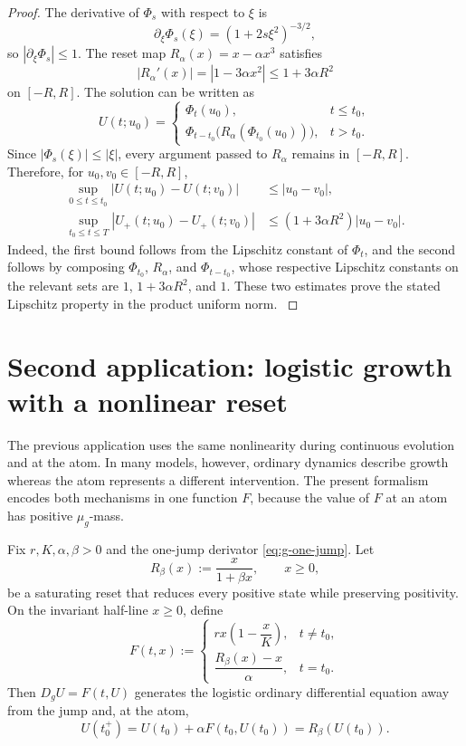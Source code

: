 \documentclass[preprint,12pt]{elsarticle}
\newenvironment{revision}{\begingroup\color{red}}{\endgroup}
\newenvironment{revision}{}{}
\theoremstyle{definition}
\theoremstyle{remark}
\begin{document}
\begin{proof}
The derivative of $\Phi_s$ with respect to $\xi$ is
\[
 \partial_\xi\Phi_s(\xi)=(1+2s\xi^2)^{-3/2},
\]
so $|\partial_\xi\Phi_s|\le1$. The reset map $R_\alpha(x)=x-\alpha x^3$ satisfies
\[
 |R_\alpha'(x)|=|1-3\alpha x^2|\le1+3\alpha R^2
\]
on $[-R,R]$. The solution can be written as
\[
 U(t;u_0)=
 \begin{cases}
 \Phi_t(u_0),&t\le t_0,\\
 \Phi_{t-t_0}\bigl(R_\alpha(\Phi_{t_0}(u_0))\bigr),&t>t_0.
 \end{cases}
\]
\begin{revision}
Since \(|\Phi_s(\xi)|\le|\xi|\), every argument passed to \(R_\alpha\)
remains in \([-R,R]\).  Therefore, for \(u_0,v_0\in[-R,R]\),
\begin{align*}
 \sup_{0\le t\le t_0}|U(t;u_0)-U(t;v_0)|
 &\le |u_0-v_0|,\\
 \sup_{t_0\le t\le T}|U_+(t;u_0)-U_+(t;v_0)|
 &\le (1+3\alpha R^2)|u_0-v_0|.
\end{align*}
Indeed, the first bound follows from the Lipschitz constant of \(\Phi_t\), and
the second follows by composing \(\Phi_{t_0}\), \(R_\alpha\), and
\(\Phi_{t-t_0}\), whose respective Lipschitz constants on the relevant sets are
\(1\), \(1+3\alpha R^2\), and \(1\).  These two estimates prove the stated
Lipschitz property in the product uniform norm.
\end{revision}
\end{proof}

\section{Second application: logistic growth with a nonlinear reset}\label{sec:logistic}

The previous application uses the same nonlinearity during continuous evolution and at the atom. In many models, however, ordinary dynamics describe growth whereas the atom represents a different intervention. The present formalism encodes both mechanisms in one function $F$, because the value of $F$ at an atom has positive $\mu_g$-mass.

Fix $r,K,\alpha,\beta>0$ and the one-jump derivator \eqref{eq:g-one-jump}. Let
\[
 R_\beta(x):=\frac{x}{1+\beta x},\qquad x\ge0,
\]
be a saturating reset that reduces every positive state while preserving positivity. On the invariant half-line $x\ge0$, define
\begin{equation}\label{eq:logistic-F}
 F(t,x):=
 \begin{cases}
 r x\left(1-\dfrac{x}{K}\right),&t\ne t_0,\\[2mm]
 \dfrac{R_\beta(x)-x}{\alpha},&t=t_0.
 \end{cases}
\end{equation}
Then $D_gU=F(t,U)$ generates the logistic ordinary differential equation away from the jump and, at the atom,
\[
 U(t_0^+)=U(t_0)+\alpha F(t_0,U(t_0))=R_\beta(U(t_0)).
\]
\end{document}
